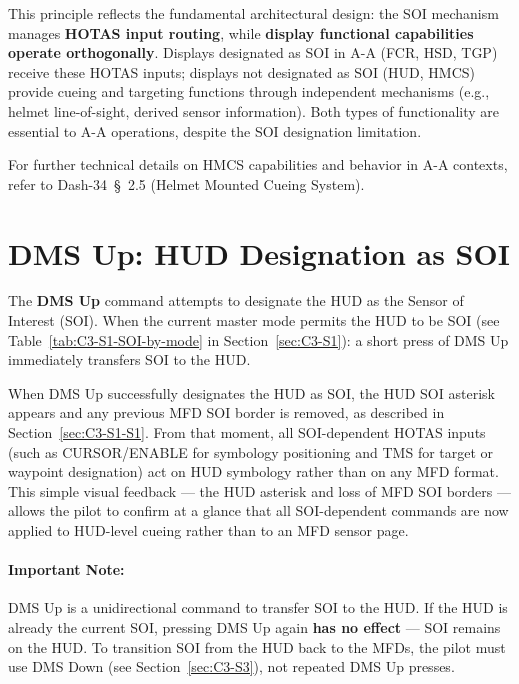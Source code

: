 \documentclass[11pt, a4paper, twoside]{report}
\providecommand{\dashref}[1]{Dash-34~\S~#1}
\begin{document}
This principle reflects the fundamental architectural design: the SOI mechanism manages \textbf{HOTAS input routing}, while \textbf{display functional capabilities operate orthogonally}. Displays designated as SOI in A-A (FCR, HSD, TGP) receive these HOTAS inputs; displays not designated as SOI (HUD, HMCS) provide cueing and targeting functions through independent mechanisms (e.g., helmet line-of-sight, derived sensor information). Both types of functionality are essential to A-A operations, despite the SOI designation limitation.

For further technical details on HMCS capabilities and behavior in A-A contexts, refer to \dashref{2.5} (Helmet Mounted Cueing System).

\section{DMS Up: HUD Designation as SOI}
\label{sec:C3-S2}

The \textbf{DMS Up} command attempts to designate the HUD as the Sensor of Interest (SOI). When the current master mode permits the HUD to be SOI (see Table~\ref{tab:C3-S1-SOI-by-mode} in Section~\ref{sec:C3-S1}): a short press of DMS Up immediately transfers SOI to the HUD.

When DMS Up successfully designates the HUD as SOI, the HUD SOI asterisk appears and any previous MFD SOI border is removed, as described in Section~\ref{sec:C3-S1-S1}. From that moment, all SOI-dependent HOTAS inputs (such as CURSOR/ENABLE for symbology positioning and TMS for target or waypoint designation) act on HUD symbology rather than on any MFD format. This simple visual feedback --- the HUD asterisk and loss of MFD SOI borders --- allows the pilot to confirm at a glance that all SOI-dependent commands are now applied to HUD-level cueing rather than to an MFD sensor page.

\paragraph*{Important Note:}

DMS Up is a unidirectional command to transfer SOI to the HUD. If the HUD is already the current SOI, pressing DMS Up again \textbf{has no effect} --- SOI remains on the HUD. To transition SOI from the HUD back to the MFDs, the pilot must use DMS Down (see Section~\ref{sec:C3-S3}), not repeated DMS Up presses.
\end{document}
